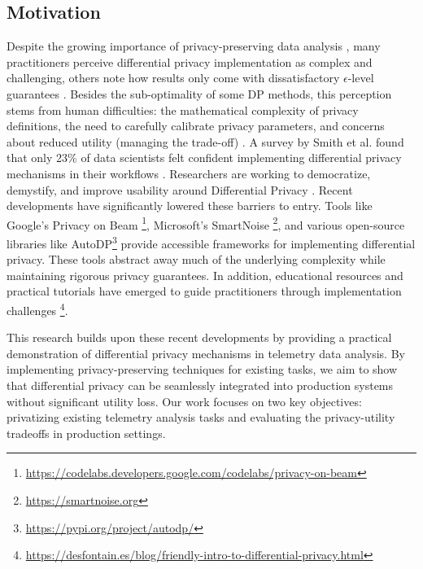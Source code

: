 \documentclass[12pt,letterpaper]{article}
\begin{document}
\subsection{Motivation}

Despite the growing importance of privacy-preserving data analysis \cite{PewPrivacy2019}, many practitioners perceive differential privacy implementation as complex and challenging, others note how results only come with dissatisfactory $\epsilon$-level guarantees \cite{FLandPrivacy}. Besides the sub-optimality of some DP methods, this perception stems from human difficulties: the mathematical complexity of privacy definitions, the need to carefully calibrate privacy parameters, and concerns about reduced utility (managing the trade-off) \cite{DP-fyML}. A survey by Smith et al. found that only 23\% of data scientists felt confident implementing differential privacy mechanisms in their workflows \cite{needed3}. Researchers are working to democratize, demystify, and improve usability around Differential Privacy \cite{DP-fyML}. Recent developments have significantly lowered these barriers to entry. Tools like Google's Privacy on Beam \footnote{\url{https://codelabs.developers.google.com/codelabs/privacy-on-beam}}, Microsoft's SmartNoise \footnote{\url{https://smartnoise.org}}, and various open-source libraries like AutoDP\footnote{\url{https://pypi.org/project/autodp/}} provide accessible frameworks for implementing differential privacy. These tools abstract away much of the underlying complexity while maintaining rigorous privacy guarantees. In addition, educational resources and practical tutorials have emerged to guide practitioners through implementation challenges \footnote{\url{https://desfontain.es/blog/friendly-intro-to-differential-privacy.html}}.


This research builds upon these recent developments by providing a practical demonstration of differential privacy mechanisms in telemetry data analysis. By implementing privacy-preserving techniques for existing tasks, we aim to show that differential privacy can be seamlessly integrated into production systems without significant utility loss. Our work focuses on two key objectives: privatizing existing telemetry analysis tasks and evaluating the privacy-utility tradeoffs in production settings.
\end{document}
